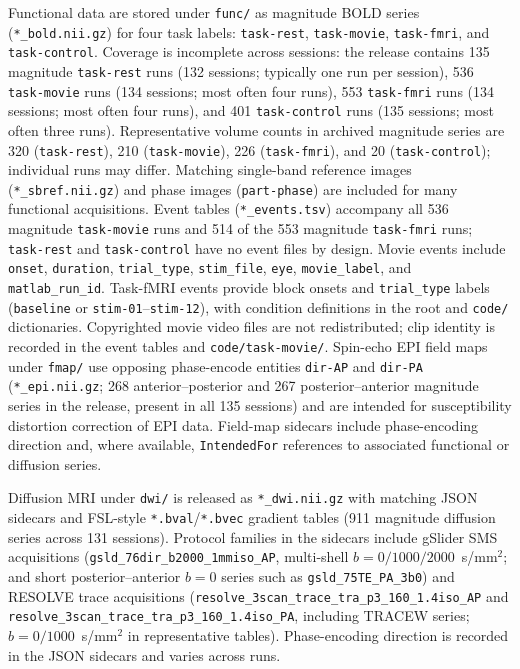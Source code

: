 Functional data are stored under \texttt{func/} as magnitude BOLD series (\texttt{*\_bold.nii.gz}) for four task labels: \texttt{task-rest}, \texttt{task-movie}, \texttt{task-fmri}, and \texttt{task-control}. Coverage is incomplete across sessions: the release contains 135 magnitude \texttt{task-rest} runs (132 sessions; typically one run per session), 536 \texttt{task-movie} runs (134 sessions; most often four runs), 553 \texttt{task-fmri} runs (134 sessions; most often four runs), and 401 \texttt{task-control} runs (135 sessions; most often three runs). Representative volume counts in archived magnitude series are 320 (\texttt{task-rest}), 210 (\texttt{task-movie}), 226 (\texttt{task-fmri}), and 20 (\texttt{task-control}); individual runs may differ. Matching single-band reference images (\texttt{*\_sbref.nii.gz}) and phase images (\texttt{part-phase}) are included for many functional acquisitions. Event tables (\texttt{*\_events.tsv}) accompany all 536 magnitude \texttt{task-movie} runs and 514 of the 553 magnitude \texttt{task-fmri} runs; \texttt{task-rest} and \texttt{task-control} have no event files by design. Movie events include \texttt{onset}, \texttt{duration}, \texttt{trial\_type}, \texttt{stim\_file}, \texttt{eye}, \texttt{movie\_label}, and \texttt{matlab\_run\_id}. Task-fMRI events provide block onsets and \texttt{trial\_type} labels (\texttt{baseline} or \texttt{stim-01}--\texttt{stim-12}), with condition definitions in the root and \texttt{code/} dictionaries. Copyrighted movie video files are not redistributed; clip identity is recorded in the event tables and \texttt{code/task-movie/}. Spin-echo EPI field maps under \texttt{fmap/} use opposing phase-encode entities \texttt{dir-AP} and \texttt{dir-PA} (\texttt{*\_epi.nii.gz}; 268 anterior--posterior and 267 posterior--anterior magnitude series in the release, present in all 135 sessions) and are intended for susceptibility distortion correction of EPI data. Field-map sidecars include phase-encoding direction and, where available, \texttt{IntendedFor} references to associated functional or diffusion series.

Diffusion MRI under \texttt{dwi/} is released as \texttt{*\_dwi.nii.gz} with matching JSON sidecars and FSL-style \texttt{*.bval}/\texttt{*.bvec} gradient tables (911 magnitude diffusion series across 131 sessions). Protocol families in the sidecars include gSlider SMS acquisitions (\texttt{gsld\_76dir\_b2000\_1mmiso\_AP}, multi-shell $b=0/1000/2000$~s/mm$^2$; and short posterior--anterior $b=0$ series such as \texttt{gsld\_75TE\_PA\_3b0}) and RESOLVE trace acquisitions (\texttt{resolve\_3scan\_trace\_tra\_p3\_160\_1.4iso\_AP} and \texttt{resolve\_3scan\_trace\_tra\_p3\_160\_1.4iso\_PA}, including TRACEW series; $b=0/1000$~s/mm$^2$ in representative tables). Phase-encoding direction is recorded in the JSON sidecars and varies across runs.

